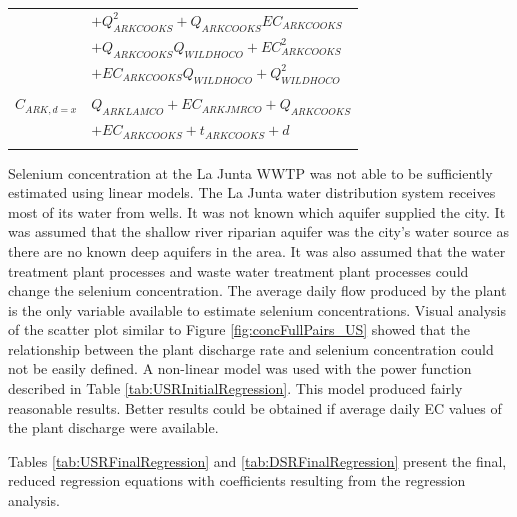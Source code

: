 \begin{linenumbers}
\begin{table}[htbp]
\begin{tabular}{c l}
					& $+ Q_{ARKCOOKS}^2+ Q_{ARKCOOKS} EC_{ARKCOOKS} $\\
					& $+ Q_{ARKCOOKS} Q_{WILDHOCO}+ EC_{ARKCOOKS}^2 $\\
					& $+ EC_{ARKCOOKS} Q_{WILDHOCO}+ Q_{WILDHOCO}^2$\\
	\\
	$ C_{ARK,d=x} $	& $Q_{ARKLAMCO} + EC_{ARKJMRCO} + Q_{ARKCOOKS}$ \\
					& $+ EC_{ARKCOOKS} + t_{ARKCOOKS} + d$\\
	\bottomrule \\
\end{tabular}
\end{table}

Selenium concentration at the La Junta WWTP was not able to be sufficiently estimated using linear models.  The La Junta water distribution system receives most of its water from wells.  It was not known which aquifer supplied the city.  It was assumed that the shallow river riparian aquifer was the city's water source as there are no known deep aquifers in the area.  It was also assumed that the water treatment plant processes and waste water treatment plant processes could change the selenium concentration.  The average daily flow produced by the plant is the only variable available to estimate selenium concentrations.  Visual analysis of the scatter plot similar to Figure \ref{fig:concFullPairs_US} showed that the relationship between the plant discharge rate and selenium concentration could not be easily defined.  A non-linear model was used with the power function described in Table \ref{tab:USRInitialRegression}.  This model produced fairly reasonable results.  Better results could be obtained if average daily EC values of the plant discharge were available.

Tables \ref{tab:USRFinalRegression} and \ref{tab:DSRFinalRegression} present the final, reduced regression equations with coefficients resulting from the regression analysis.


\end{linenumbers}
